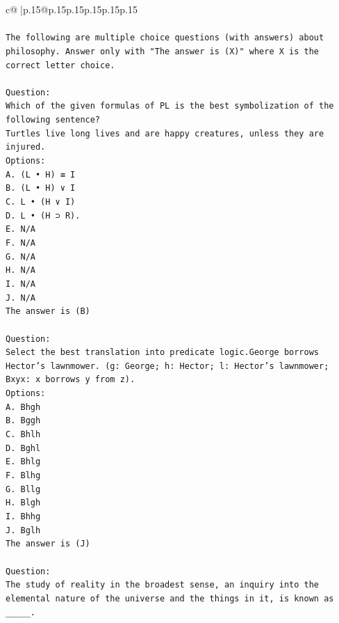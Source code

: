 \documentclass{article}
\begin{document}
{\begin{supertabular}{c@{$\;$}|p{.15\linewidth}@{}p{.15\linewidth}p{.15\linewidth}p{.15\linewidth}p{.15\linewidth}p{.15\linewidth}}
{{{\\ 
\\ 
\texttt{The following are multiple choice questions (with answers) about philosophy. Answer only with "The answer is (X)" where X is the correct letter choice.} \\
\\ 
\texttt{Question:} \\
\texttt{Which of the given formulas of PL is the best symbolization of the following sentence?} \\
\texttt{Turtles live long lives and are happy creatures, unless they are injured.} \\
\texttt{Options:} \\
\texttt{A. (L • H) ≡ I} \\
\texttt{B. (L • H) ∨ I} \\
\texttt{C. L • (H ∨ I)} \\
\texttt{D. L • (H ⊃ R).} \\
\texttt{E. N/A} \\
\texttt{F. N/A} \\
\texttt{G. N/A} \\
\texttt{H. N/A} \\
\texttt{I. N/A} \\
\texttt{J. N/A} \\
\texttt{The answer is (B)} \\
\\ 
\texttt{Question:} \\
\texttt{Select the best translation into predicate logic.George borrows Hector's lawnmower. (g: George; h: Hector; l: Hector's lawnmower; Bxyx: x borrows y from z).} \\
\texttt{Options:} \\
\texttt{A. Bhgh} \\
\texttt{B. Bggh} \\
\texttt{C. Bhlh} \\
\texttt{D. Bghl} \\
\texttt{E. Bhlg} \\
\texttt{F. Blhg} \\
\texttt{G. Bllg} \\
\texttt{H. Blgh} \\
\texttt{I. Bhhg} \\
\texttt{J. Bglh} \\
\texttt{The answer is (J)} \\
\\ 
\texttt{Question:} \\
\texttt{The study of reality in the broadest sense, an inquiry into the elemental nature of the universe and the things in it, is known as \_\_\_\_\_.} \\
}}}
\end{supertabular}}
\end{document}
